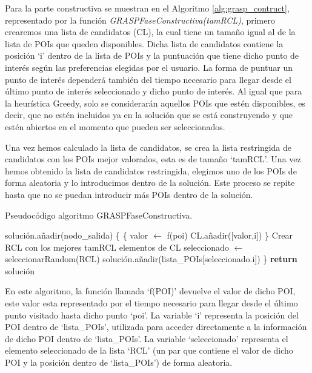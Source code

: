Para la parte constructiva se muestran en el Algoritmo \ref{alg:grasp_contruct}, representado por la función \textit{GRASPFaseConstructiva(tamRCL)}, primero crearemos una lista de candidatos (CL), la cual tiene un tamaño igual al de la lista de POIs que queden disponibles. Dicha lista de candidatos contiene la posición \enquote*{i} dentro de la lista de POIs y la puntuación que tiene dicho punto de interés según las preferencias elegidas por el usuario. La forma de puntuar un punto de interés dependerá también del tiempo necesario para llegar desde el último punto de interés seleccionado y dicho punto de interés. Al igual que para la heurística Greedy, solo se considerarán aquellos POIs que estén disponibles, es decir, que no estén incluidos ya en la solución que se está construyendo y que estén abiertos en el momento que pueden ser seleccionados.\newline

Una vez hemos calculado la lista de candidatos, se crea la lista restringida de candidatos con los POIs mejor valorados, esta es de tamaño \enquote*{tamRCL}. Una vez hemos obtenido la lista de candidatos restringida, elegimos uno de los POIs de forma aleatoria y lo introducimos dentro de la solución. Este proceso se repite hasta que no se puedan introducir más POIs dentro de la solución.\newline
\newpage
\begin{algorithm}[H]
	\caption{Pseudocódigo algoritmo GRASPFaseConstructiva.}
	\label{alg:grasp_contruct}
	\begin{algorithmic}
		\State solución.añadir(nodo\_salida)
		\{
			\{
				\State valor $\gets$ f(poi)
				\State CL.añadir([valor,i])
				\State \}
			\EndFor
			\State Crear RCL con los mejores tamRCL elementos de CL
			\State seleccionado $\gets$ seleccionarRandom(RCL)
			\State solución.añadir(lista\_POIs[seleccionado.i])
			\State \}
		\EndWhile
		\State \textbf{return} solución
		\EndFunction
	\end{algorithmic}
\end{algorithm}


En este algoritmo, la función llamada \enquote*{f(POI)} devuelve el valor de dicho POI, este valor esta representado por el tiempo necesario para llegar desde el último punto visitado hasta dicho punto \enquote*{poi}. La variable \enquote*{i} representa la posición del POI dentro de \enquote*{lista\_POIs}, utilizada para acceder directamente a la información de dicho POI dentro de \enquote*{lista\_POIs}. La variable \enquote*{seleccionado} representa el elemento seleccionado de la lista \enquote*{RCL} (un par que contiene el valor de dicho POI y la posición dentro de \enquote*{lista\_POIs}) de forma aleatoria.\newline

